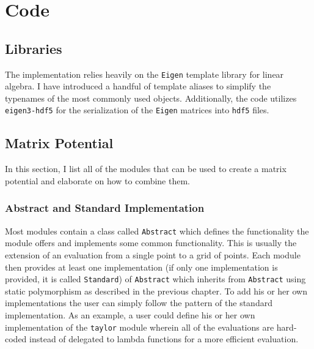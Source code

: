 
\chapter{Code} %

\label{Code} %



\section{Libraries}
The implementation relies heavily on the \texttt{Eigen}\cite{eigenweb} template library for linear algebra. I have introduced a handful of template aliases to simplify the typenames of the most commonly used objects. Additionally, the code utilizes \texttt{eigen3-hdf5}\cite{eigen3-hdf5} for the serialization of the \texttt{Eigen} matrices into \texttt{hdf5} files.

\section{Matrix Potential}
In this section, I list all of the modules that can be used to create a matrix potential and elaborate on how to combine them.

\subsection{Abstract and Standard Implementation}
Most modules contain a class called \texttt{Abstract} which defines the functionality the module offers and implements some common functionality. This is usually the extension of an evaluation from a single point to a grid of points. Each module then provides at least one implementation (if only one implementation is provided, it is called \texttt{Standard}) of \texttt{Abstract} which inherits from \texttt{Abstract} using static polymorphism as described in the previous chapter. To add his or her own implementations the user can simply follow the pattern of the standard implementation. As an example, a user could define his or her own implementation of the \texttt{taylor} module wherein all of the evaluations are hard-coded instead of delegated to lambda functions for a more efficient evaluation.

